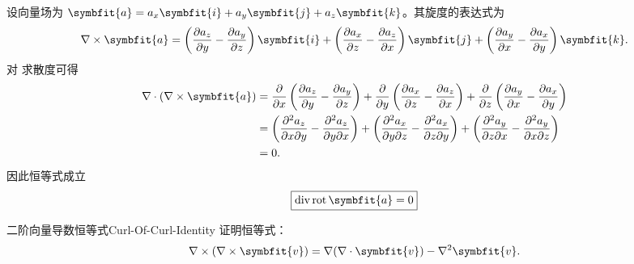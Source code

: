 \begin{myproof}
    设向量场为 $\symbfit{a} = a_x \symbfit{i} + a_y \symbfit{j} + a_z \symbfit{k}$。其旋度的表达式为
    \begin{equation}\label{eq:curl-def}
        \nabla \times \symbfit{a} = \left( \frac{\partial a_z}{\partial y} - \frac{\partial a_y}{\partial z} \right) \symbfit{i} + \left( \frac{\partial a_x}{\partial z} - \frac{\partial a_z}{\partial x} \right) \symbfit{j} + \left( \frac{\partial a_y}{\partial x} - \frac{\partial a_x}{\partial y} \right) \symbfit{k}.
    \end{equation}
    对  求散度可得
    \begin{equation}\label{eq:div-rot-calc}
        \begin{aligned}
            \nabla \cdot (\nabla \times \symbfit{a}) & = \frac{\partial}{\partial x} \left( \frac{\partial a_z}{\partial y} - \frac{\partial a_y}{\partial z} \right) + \frac{\partial}{\partial y} \left( \frac{\partial a_x}{\partial z} - \frac{\partial a_z}{\partial x} \right) + \frac{\partial}{\partial z} \left( \frac{\partial a_y}{\partial x} - \frac{\partial a_x}{\partial y} \right) \\
                                                     & = \left( \frac{\partial^2 a_z}{\partial x \partial y} - \frac{\partial^2 a_z}{\partial y \partial x} \right) + \left( \frac{\partial^2 a_x}{\partial y \partial z} - \frac{\partial^2 a_x}{\partial z \partial y} \right) + \left( \frac{\partial^2 a_y}{\partial z \partial x} - \frac{\partial^2 a_y}{\partial x \partial z} \right)       \\
                                                     & = 0.
        \end{aligned}
    \end{equation}
    因此恒等式成立
    \begin{equation}\label{eq:div-rot-final}
        \boxed{\operatorname{div} \operatorname{rot} \symbfit{a} = 0}
    \end{equation}
\end{myproof}


\begin{problem}{二阶向量导数恒等式}{Curl-Of-Curl-Identity}
    证明恒等式：
    \begin{equation*}
        \nabla \times (\nabla \times \symbfit{v}) = \nabla (\nabla \cdot \symbfit{v}) - \nabla^2 \symbfit{v}.
    \end{equation*}
\end{problem}

